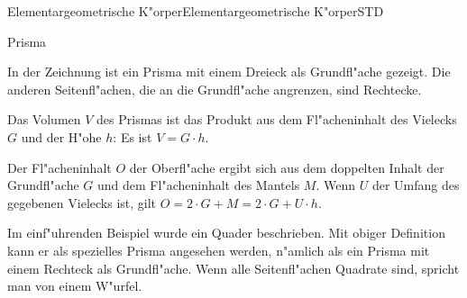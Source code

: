 \begin{MXContent}{Elementargeometrische K"orper}{Elementargeometrische K"orper}{STD}
\begin{MXInfo}{Prisma}
\begin{center}
\end{center}

In der Zeichnung ist ein Prisma mit einem Dreieck als Grundfl"ache gezeigt. Die
anderen Seitenfl"achen, die an die Grundfl"ache angrenzen, sind Rechtecke.

Das Volumen $V$ des Prismas ist das Produkt aus dem Fl"acheninhalt des Vielecks 
$G$ und der H"ohe $h$: Es ist $V = G \cdot h$.

Der Fl"acheninhalt $O$ der Oberfl"ache ergibt sich aus dem doppelten Inhalt der 
Grundfl"ache $G$ und dem Fl"acheninhalt des Mantels $M$. Wenn $U$ der Umfang 
des gegebenen Vielecks ist, gilt $O = 2 \cdot G + M = 2 \cdot G + U \cdot h$.
\end{MXInfo}

Im einf"uhrenden Beispiel wurde ein Quader beschrieben. Mit obiger Definition
kann er als spezielles Prisma angesehen werden, n"amlich als ein Prisma mit einem 
Rechteck als Grundfl"ache. Wenn alle Seitenfl"achen Quadrate sind, spricht man
von einem W"urfel.


\end{MXContent}
